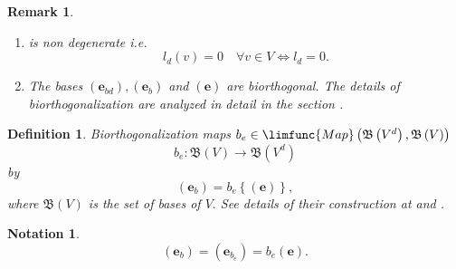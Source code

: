 \documentclass[aps,preprint]{revtex4}
\newtheorem{definition}[theorem]{Definition}
\newtheorem{notation}[theorem]{Notation}
\newtheorem{remark}[theorem]{Remark}
\begin{document}
\begin{remark}
\begin{enumerate}
\item is non degenerate i.e. 
\begin{equation}
l_{d}\left( v\right) =0\quad \forall v\in V\Leftrightarrow l_{d}=0.
\end{equation}

\item The bases $\left( \boldsymbol{e}_{bd}\right) ,\left( \boldsymbol{e}%
_{b}\right) $ and $\left( \boldsymbol{e}\right) $ are biorthogonal. The
details of biorthogonalization are analyzed in detail in the section 
%
.
\end{enumerate}
\end{remark}

\begin{definition}
Biorthogonalization maps $b_{e}\in \limfunc{Map}\left( \mathfrak{B}\left(
V^{d}\right) ,\mathfrak{B}\left( V\right) \right) $ 
\begin{equation}
b_{e}:\mathfrak{B}\left( V\right) \rightarrow \mathfrak{B}\left( V^{d}\right)
\end{equation}%
by 
\begin{equation}
\left( \boldsymbol{e}_{b}\right) =b_{e}\left\{ \left( \boldsymbol{e}\right)
\right\} ,
\end{equation}%
where $\mathfrak{B}\left( V\right) $ is the set of bases of $V.$ See details
of their construction at 
and 
%
.
\end{definition}

\begin{notation}
\begin{equation}
\left( \boldsymbol{e}_{b}\right) =\left( \boldsymbol{e}_{b_{e}}\right)
=b_{e}\left( \boldsymbol{e}\right) .
\end{equation}
\end{notation}
\end{document}
